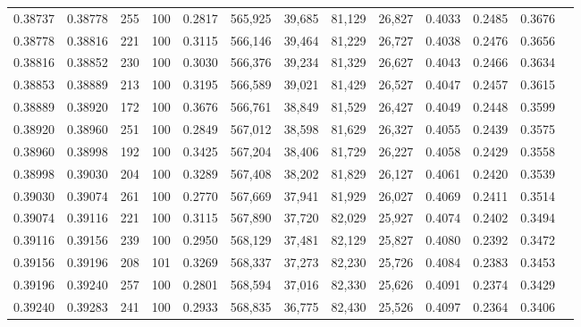 \begin{tabular}{rrrrrrrrrrrrr}
0.38737 & 0.38778 &   255 & 100 &                                     0.2817 & 565,925 &  39,685 &  81,129 &  26,827 & 0.4033 & 0.2485 & 0.3676 \\
0.38778 & 0.38816 &   221 & 100 &                                     0.3115 & 566,146 &  39,464 &  81,229 &  26,727 & 0.4038 & 0.2476 & 0.3656 \\
0.38816 & 0.38852 &   230 & 100 &                                     0.3030 & 566,376 &  39,234 &  81,329 &  26,627 & 0.4043 & 0.2466 & 0.3634 \\
0.38853 & 0.38889 &   213 & 100 &                                     0.3195 & 566,589 &  39,021 &  81,429 &  26,527 & 0.4047 & 0.2457 & 0.3615 \\
0.38889 & 0.38920 &   172 & 100 &                                     0.3676 & 566,761 &  38,849 &  81,529 &  26,427 & 0.4049 & 0.2448 & 0.3599 \\
0.38920 & 0.38960 &   251 & 100 &                                     0.2849 & 567,012 &  38,598 &  81,629 &  26,327 & 0.4055 & 0.2439 & 0.3575 \\
0.38960 & 0.38998 &   192 & 100 &                                     0.3425 & 567,204 &  38,406 &  81,729 &  26,227 & 0.4058 & 0.2429 & 0.3558 \\
0.38998 & 0.39030 &   204 & 100 &                                     0.3289 & 567,408 &  38,202 &  81,829 &  26,127 & 0.4061 & 0.2420 & 0.3539 \\
0.39030 & 0.39074 &   261 & 100 &                                     0.2770 & 567,669 &  37,941 &  81,929 &  26,027 & 0.4069 & 0.2411 & 0.3514 \\
0.39074 & 0.39116 &   221 & 100 &                                     0.3115 & 567,890 &  37,720 &  82,029 &  25,927 & 0.4074 & 0.2402 & 0.3494 \\
0.39116 & 0.39156 &   239 & 100 &                                     0.2950 & 568,129 &  37,481 &  82,129 &  25,827 & 0.4080 & 0.2392 & 0.3472 \\
0.39156 & 0.39196 &   208 & 101 &                                     0.3269 & 568,337 &  37,273 &  82,230 &  25,726 & 0.4084 & 0.2383 & 0.3453 \\
0.39196 & 0.39240 &   257 & 100 &                                     0.2801 & 568,594 &  37,016 &  82,330 &  25,626 & 0.4091 & 0.2374 & 0.3429 \\
0.39240 & 0.39283 &   241 & 100 &                                     0.2933 & 568,835 &  36,775 &  82,430 &  25,526 & 0.4097 & 0.2364 & 0.3406 \\

\end{tabular}
